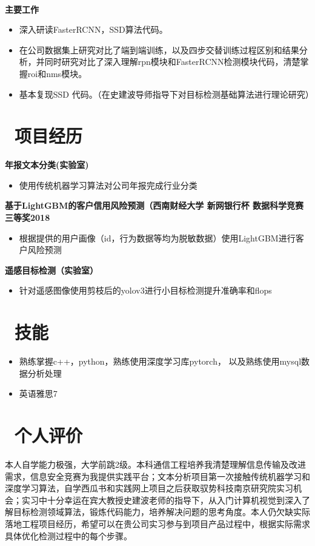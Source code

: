 \documentclass[14pt]{resume}
\begin{document}
\\
\textbf{主要工作}
\begin{itemize}
    \item 深入研读FasterRCNN，SSD算法代码。
    \item 在公司数据集上研究对比了端到端训练，以及四步交替训练过程区别和结果分析，并同时研究对比了深入理解rpn模块和FasterRCNN检测模块代码，清楚掌握roi和nms模块。\item 基本复现SSD 代码。（在史建波导师指导下对目标检测基础算法进行理论研究）
\end{itemize}

\section{\faUsers\ 项目经历}
\textbf{年报文本分类(实验室)}
\begin{itemize}
    \item 使用传统机器学习算法对公司年报完成行业分类
\end{itemize}

\textbf{基于LightGBM的客户信用风险预测（西南财经大学 新网银行杯 数据科学竞赛三等奖2018}
\begin{itemize}
    \item 根据提供的用户画像（id，行为数据等均为脱敏数据）使用LightGBM进行客户风险预测
\end{itemize}

\textbf{遥感目标检测（实验室）}
\begin{itemize}
    \item 针对遥感图像使用剪枝后的yolov3进行小目标检测提升准确率和flops
\end{itemize}

\section{\faCogs\ 技能}
\begin{itemize}
    \item 熟练掌握c++，python，熟练使用深度学习库pytorch， 以及熟练使用mysql数据分析处理
    \item 英语雅思7
    
\end{itemize}
\section{\faUniversity\ 个人评价}
本人自学能力极强，大学前跳2级。本科通信工程培养我清楚理解信息传输及改进需求，信息安全竞赛为我提供实践平台；文本分析项目第一次接触传统机器学习和深度学习算法，自学西瓜书和实践网上项目之后获取驭势科技南京研究院实习机会；实习中十分幸运在宾大教授史建波老师的指导下，从入门计算机视觉到深入了解目标检测领域算法，锻炼代码能力，培养解决问题的思考角度。本人仍欠缺实际落地工程项目经历，希望可以在贵公司实习参与到项目产品过程中，根据实际需求具体优化检测过程中的每个步骤。
\end{document}
